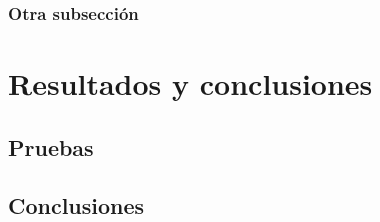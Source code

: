 \documentclass[a4paper, 12pt]{article} %
\begin{document}
\subsubsection{Otra subsección}

\section{Resultados y conclusiones}

\subsection{Pruebas}

\subsection{Conclusiones}

\printbibliography[heading=bibnumbered] %
\end{document}
